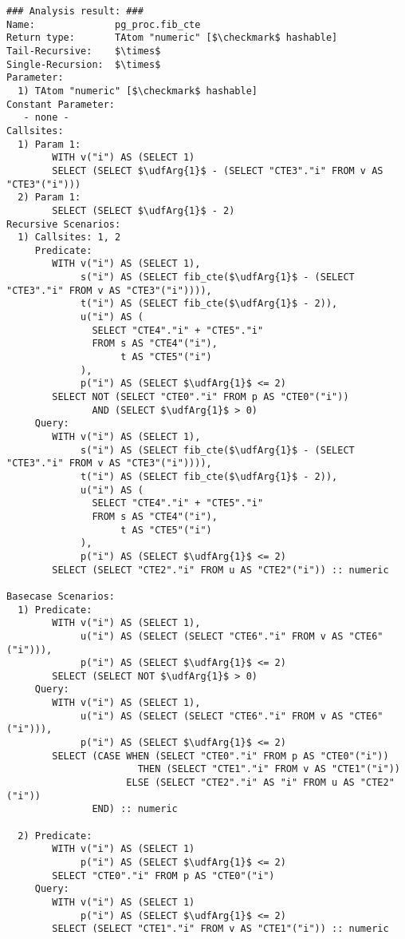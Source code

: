 \begin{lstlisting}[language={},basicstyle=\scriptsize]
### Analysis result: ###
Name:              pg_proc.fib_cte
Return type:       TAtom "numeric" [$\checkmark$ hashable]
Tail-Recursive:    $\times$
Single-Recursion:  $\times$
Parameter:
  1) TAtom "numeric" [$\checkmark$ hashable]
Constant Parameter:
   - none -
Callsites:
  1) Param 1:
        WITH v("i") AS (SELECT 1)
        SELECT (SELECT $\udfArg{1}$ - (SELECT "CTE3"."i" FROM v AS "CTE3"("i"))) 
  2) Param 1:
        SELECT (SELECT $\udfArg{1}$ - 2)
Recursive Scenarios:
  1) Callsites: 1, 2
     Predicate:
        WITH v("i") AS (SELECT 1), 
             s("i") AS (SELECT fib_cte($\udfArg{1}$ - (SELECT "CTE3"."i" FROM v AS "CTE3"("i")))), 
             t("i") AS (SELECT fib_cte($\udfArg{1}$ - 2)), 
             u("i") AS (
               SELECT "CTE4"."i" + "CTE5"."i"                    
               FROM s AS "CTE4"("i"),
                    t AS "CTE5"("i")
             ),
             p("i") AS (SELECT $\udfArg{1}$ <= 2)
        SELECT NOT (SELECT "CTE0"."i" FROM p AS "CTE0"("i"))
               AND (SELECT $\udfArg{1}$ > 0)
     Query:
        WITH v("i") AS (SELECT 1), 
             s("i") AS (SELECT fib_cte($\udfArg{1}$ - (SELECT "CTE3"."i" FROM v AS "CTE3"("i")))), 
             t("i") AS (SELECT fib_cte($\udfArg{1}$ - 2)), 
             u("i") AS (
               SELECT "CTE4"."i" + "CTE5"."i"                    
               FROM s AS "CTE4"("i"),
                    t AS "CTE5"("i")
             ),
             p("i") AS (SELECT $\udfArg{1}$ <= 2)
        SELECT (SELECT "CTE2"."i" FROM u AS "CTE2"("i")) :: numeric 

Basecase Scenarios:
  1) Predicate:
        WITH v("i") AS (SELECT 1), 
             u("i") AS (SELECT (SELECT "CTE6"."i" FROM v AS "CTE6"("i"))), 
             p("i") AS (SELECT $\udfArg{1}$ <= 2)
        SELECT (SELECT NOT $\udfArg{1}$ > 0)
     Query:
        WITH v("i") AS (SELECT 1), 
             u("i") AS (SELECT (SELECT "CTE6"."i" FROM v AS "CTE6"("i"))), 
             p("i") AS (SELECT $\udfArg{1}$ <= 2)
        SELECT (CASE WHEN (SELECT "CTE0"."i" FROM p AS "CTE0"("i"))
                       THEN (SELECT "CTE1"."i" FROM v AS "CTE1"("i"))
                     ELSE (SELECT "CTE2"."i" AS "i" FROM u AS "CTE2"("i"))
               END) :: numeric 

  2) Predicate:
        WITH v("i") AS (SELECT 1)
             p("i") AS (SELECT $\udfArg{1}$ <= 2)
        SELECT "CTE0"."i" FROM p AS "CTE0"("i")
     Query:
        WITH v("i") AS (SELECT 1)
             p("i") AS (SELECT $\udfArg{1}$ <= 2)
        SELECT (SELECT "CTE1"."i" FROM v AS "CTE1"("i")) :: numeric
\end{lstlisting}